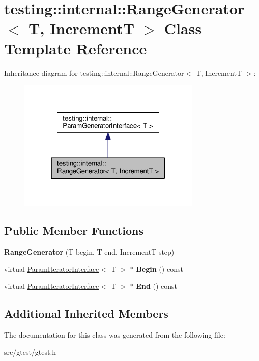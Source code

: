\hypertarget{classtesting_1_1internal_1_1_range_generator}{}\section{testing\+:\+:internal\+:\+:Range\+Generator$<$ T, IncrementT $>$ Class Template Reference}
\label{classtesting_1_1internal_1_1_range_generator}


Inheritance diagram for testing\+:\+:internal\+:\+:Range\+Generator$<$ T, IncrementT $>$\+:
\nopagebreak
\begin{figure}[H]
\begin{center}
\leavevmode
\includegraphics[width=247pt]{classtesting_1_1internal_1_1_range_generator__inherit__graph}
\end{center}
\end{figure}
\subsection*{Public Member Functions}
\begin{DoxyCompactItemize}
\item 
\mbox{\label{classtesting_1_1internal_1_1_range_generator_a5b3b83223b9cada3569bcee729e0fdf3}} 
{\bfseries Range\+Generator} (T begin, T end, IncrementT step)
\item 
\mbox{\label{classtesting_1_1internal_1_1_range_generator_ae68b59f9348ecf93e0947545a2424765}} 
virtual \mbox{\hyperlink{classtesting_1_1internal_1_1_param_iterator_interface}{Param\+Iterator\+Interface}}$<$ T $>$ $\ast$ {\bfseries Begin} () const
\item 
\mbox{\label{classtesting_1_1internal_1_1_range_generator_a8d2acbb733791a14df6e7bd3754e9003}} 
virtual \mbox{\hyperlink{classtesting_1_1internal_1_1_param_iterator_interface}{Param\+Iterator\+Interface}}$<$ T $>$ $\ast$ {\bfseries End} () const
\end{DoxyCompactItemize}
\subsection*{Additional Inherited Members}


The documentation for this class was generated from the following file\+:\begin{DoxyCompactItemize}
\item 
src/gtest/gtest.\+h\end{DoxyCompactItemize}
